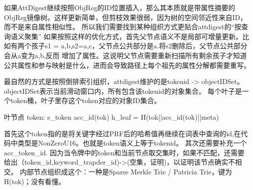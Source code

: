 如果AttDigest继续按照ObjReg的ID位置插入，那么其本质就是带属性摘要的ObjReg镜像树。这样更新简单，但剪枝效果很弱，因为树的空间邻近性来自ID，而不是来自属性相似性。
所以我们需要找到某种组织方式更贴合attdigest的“按查询语义聚集”
如果按照这样的优化方式，首先父节点语义不是局部可增量更新。比如有两个孩子s1 = {a,b},s2={a,c}，父节点公共部分是{a}.将s2删除后，父节点公共部分会从{a}变为{a,b},反而
增加了属性。这说明父节点需要重新扫描所有剩余孩子才知道公共属性和参与映射是什么，进而会导致路径上每个祖先的属性分解都需要重写。

最自然的方式是按照倒排索引组织，attdigest维护的是tokenid -> objectIDSet。 objectIDSet表示当前滑动窗口内，所有包含该tokenid的对象集合。
每个叶子是一个token桶，叶子里存这个token对应的对象ID集合。

叶节点
token:
s_token
acc_id(tok)
h_leaf = H(tok||acc_id(tok)||meta)

首先这个token指的是将关键字经过PRF后的哈希值再继续在词表中查询的id,在代码中类型是NonZeroU16。也就是token语义上等于tokenid。
其次还需要补充一个acc_token_id.
因为当令牌中的token和当前节点取交集时，如果不匹配，还需要给出（token_id,keyword_trapder_id)->(空集，证明)，以证明该节点确实不相交。
内部节点组织成这个：一种是Sparse Merkle Trie / Patricia Trie，键为 H(tok)；没有看懂。


